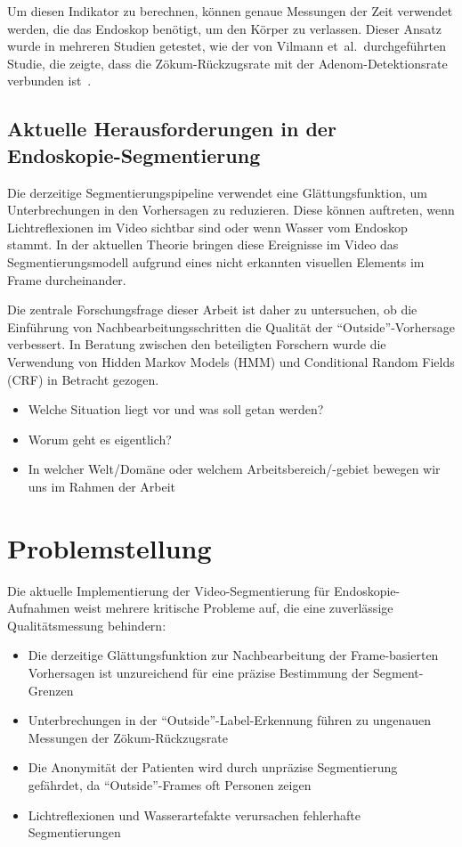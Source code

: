 Um diesen Indikator zu berechnen, können genaue Messungen der Zeit verwendet werden, die das Endoskop benötigt, um den Körper zu verlassen. Dieser Ansatz wurde in mehreren Studien getestet, wie der von Vilmann et~al.\ durchgeführten Studie, die zeigte, dass die Zökum-Rückzugsrate mit der Adenom-Detektionsrate verbunden ist~\citep{vilmann-2022}.

\subsection{Aktuelle Herausforderungen in der Endoskopie-Segmentierung}

Die derzeitige Segmentierungspipeline verwendet eine Glättungsfunktion, um Unterbrechungen in den Vorhersagen zu reduzieren. Diese können auftreten, wenn Lichtreflexionen im Video sichtbar sind oder wenn Wasser vom Endoskop stammt. In der aktuellen Theorie bringen diese Ereignisse im Video das Segmentierungsmodell aufgrund eines nicht erkannten visuellen Elements im Frame durcheinander.

Die zentrale Forschungsfrage dieser Arbeit ist daher zu untersuchen, ob die Einführung von Nachbearbeitungsschritten die Qualität der \enquote{Outside}-Vorhersage verbessert. In Beratung zwischen den beteiligten Forschern wurde die Verwendung von Hidden Markov Models (HMM) und Conditional Random Fields (CRF) in Betracht gezogen.

\begin{itemize}
\item Welche Situation liegt vor und was soll getan werden?
\item Worum geht es eigentlich?
\item In welcher Welt/Domäne oder welchem Arbeitsbereich/-gebiet bewegen wir uns im Rahmen der Arbeit
\end{itemize}
\section{Problemstellung}

Die aktuelle Implementierung der Video-Segmentierung für Endoskopie-Aufnahmen weist mehrere kritische Probleme auf, die eine zuverlässige Qualitätsmessung behindern:

\begin{itemize}
\item Die derzeitige Glättungsfunktion zur Nachbearbeitung der Frame-basierten Vorhersagen ist unzureichend für eine präzise Bestimmung der Segment-Grenzen
\item Unterbrechungen in der \enquote{Outside}-Label-Erkennung führen zu ungenauen Messungen der Zökum-Rückzugsrate
\item Die Anonymität der Patienten wird durch unpräzise Segmentierung gefährdet, da \enquote{Outside}-Frames oft Personen zeigen
\item Lichtreflexionen und Wasserartefakte verursachen fehlerhafte Segmentierungen
\end{itemize}

